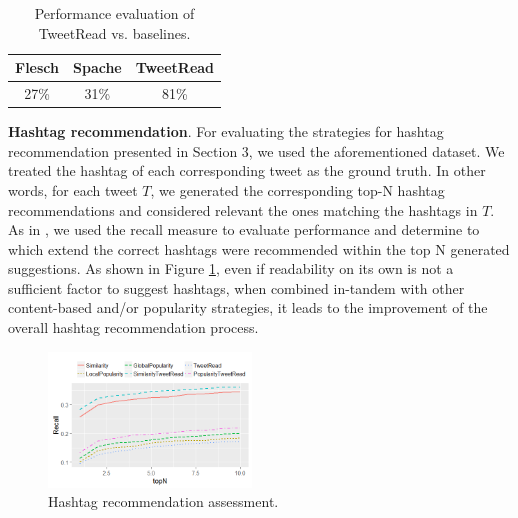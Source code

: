 \documentclass{sig-alternate-05-2015}
\begin{document}
\begin{table}[]
\centering
\begin{tabular}{|c|c|c|}
\hline
Flesch & Spache & TweetRead \\ \hline
27\% & 31\% & 81\% \\ \hline
\end{tabular}
\caption{Performance evaluation of TweetRead vs. baselines.}
\label{tab:read}
\vspace{-0.5cm}
\end{table}

\textbf{Hashtag recommendation}. For evaluating the strategies for hashtag recommendation presented in Section 3, we used the aforementioned dataset. We treated the hashtag of each corresponding tweet as the ground truth. In other words, for each tweet $T$, we generated the corresponding top-N hashtag recommendations and considered relevant the ones matching the hashtags in $T$. As in \cite{hashtagRec}, we used the recall measure to evaluate performance and determine to which  extend the correct hashtags were recommended within the top N generated suggestions.
As shown in Figure \ref{fig:comparison}, even if readability on its own is not a sufficient factor to suggest hashtags, when combined in-tandem with other content-based and/or popularity strategies, it leads to the improvement of the overall hashtag recommendation process. %
\begin{figure}[h]

\centering
\includegraphics[width=0.48\textwidth]{comparison}
\caption{Hashtag recommendation assessment.}
\label{fig:comparison}
\vspace{-0.5cm}
\end{figure}
\end{document}
